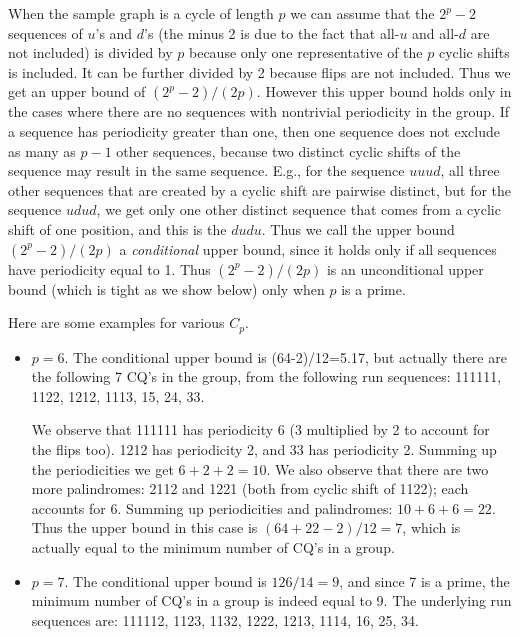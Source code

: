 When the sample graph is a cycle of length
$p$ we can assume that the $2^p-2$ sequences of
$u$'s and $d$'s (the minus 2 is due to the fact
that all-$u$ and all-$d$ are not included) is divided by $p$
because only one representative of the $p$ cyclic shifts is included. It can be further divided by 2 because flips are
not included. Thus we get an upper bound of $(2^p-2)/(2p)$.
However this upper bound holds only in the cases
where there are no
sequences with nontrivial periodicity in the group.
If a sequence
has periodicity greater than one, then one sequence does not exclude as many as $p-1$ other sequences,
because  two distinct cyclic shifts of the sequence may result in the same sequence.
E.g., for the sequence $uuud$, all three other sequences that are created by a cyclic
shift are pairwise distinct, but for the sequence $udud$, we get only one other distinct
sequence that comes from a cyclic shift of one position, and this is the $dudu$.
Thus we call the upper bound  $(2^p-2)/(2p)$ a {\em conditional} upper
bound, since it holds only if all sequences have periodicity equal to 1.
Thus   $(2^p-2)/(2p)$ is an unconditional
upper bound (which is tight as we show below)
only when $p$ is a prime.

\begin{example}
Here are some examples for various $C_p$.

\begin{itemize}
\item $p=6$.  The conditional upper bound is (64-2)/12=5.17, but actually there are the following 7 CQ's in the group, from the following run sequences:
 111111,
 1122,
 1212,
 1113,
 15,
 24,
 33.

We observe that 111111 has periodicity 6 (3 multiplied by 2 to account for the flips too).
1212 has periodicity 2, and 33 has periodicity 2.  Summing up the
periodicities we get $6+2+2=10$.
We also observe that there are two more palindromes: 2112 and
1221 (both from cyclic shift of 1122); each accounts for 6.
Summing up periodicities and palindromes: $10+6+6=22$.
Thus the upper bound
in this case is $(64+22-2)/12=7$, which is actually equal to the
minimum number of CQ's in a group.

\item $p=7$.  The conditional upper bound is $126/14=9$, and since 7 is a prime,
the minimum number of CQ's in a group is indeed equal to 9.
The underlying run sequences are:
 111112,
 1123,
 1132,
 1222,
 1213,
 1114,
 16,
 25,
 34.

\end{itemize}
\end{example}


